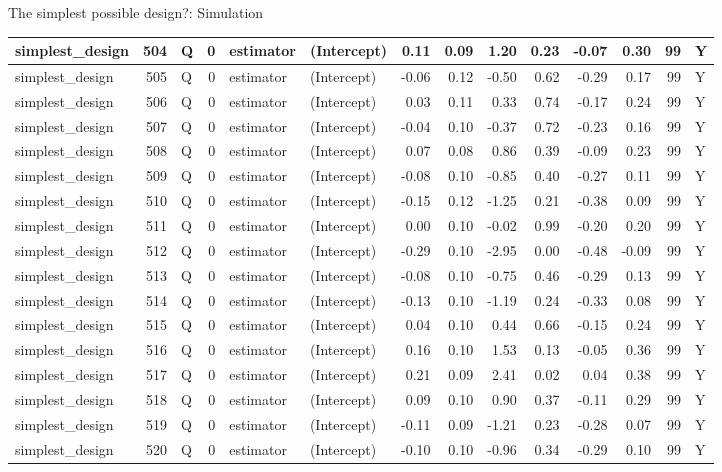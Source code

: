\documentclass[
  11pt,
  ignorenonframetext,
]{beamer}
\begin{document}
\begin{frame}[fragile]{The simplest possible design?: Simulation}
\begin{tabular}{l|r|l|r|l|l|r|r|r|r|r|r|r|l}
\hline
simplest\_design & 504 & Q & 0 & estimator & (Intercept) & 0.11 & 0.09 & 1.20 & 0.23 & -0.07 & 0.30 & 99 & Y\\
\hline
simplest\_design & 505 & Q & 0 & estimator & (Intercept) & -0.06 & 0.12 & -0.50 & 0.62 & -0.29 & 0.17 & 99 & Y\\
\hline
simplest\_design & 506 & Q & 0 & estimator & (Intercept) & 0.03 & 0.11 & 0.33 & 0.74 & -0.17 & 0.24 & 99 & Y\\
\hline
simplest\_design & 507 & Q & 0 & estimator & (Intercept) & -0.04 & 0.10 & -0.37 & 0.72 & -0.23 & 0.16 & 99 & Y\\
\hline
simplest\_design & 508 & Q & 0 & estimator & (Intercept) & 0.07 & 0.08 & 0.86 & 0.39 & -0.09 & 0.23 & 99 & Y\\
\hline
simplest\_design & 509 & Q & 0 & estimator & (Intercept) & -0.08 & 0.10 & -0.85 & 0.40 & -0.27 & 0.11 & 99 & Y\\
\hline
simplest\_design & 510 & Q & 0 & estimator & (Intercept) & -0.15 & 0.12 & -1.25 & 0.21 & -0.38 & 0.09 & 99 & Y\\
\hline
simplest\_design & 511 & Q & 0 & estimator & (Intercept) & 0.00 & 0.10 & -0.02 & 0.99 & -0.20 & 0.20 & 99 & Y\\
\hline
simplest\_design & 512 & Q & 0 & estimator & (Intercept) & -0.29 & 0.10 & -2.95 & 0.00 & -0.48 & -0.09 & 99 & Y\\
\hline
simplest\_design & 513 & Q & 0 & estimator & (Intercept) & -0.08 & 0.10 & -0.75 & 0.46 & -0.29 & 0.13 & 99 & Y\\
\hline
simplest\_design & 514 & Q & 0 & estimator & (Intercept) & -0.13 & 0.10 & -1.19 & 0.24 & -0.33 & 0.08 & 99 & Y\\
\hline
simplest\_design & 515 & Q & 0 & estimator & (Intercept) & 0.04 & 0.10 & 0.44 & 0.66 & -0.15 & 0.24 & 99 & Y\\
\hline
simplest\_design & 516 & Q & 0 & estimator & (Intercept) & 0.16 & 0.10 & 1.53 & 0.13 & -0.05 & 0.36 & 99 & Y\\
\hline
simplest\_design & 517 & Q & 0 & estimator & (Intercept) & 0.21 & 0.09 & 2.41 & 0.02 & 0.04 & 0.38 & 99 & Y\\
\hline
simplest\_design & 518 & Q & 0 & estimator & (Intercept) & 0.09 & 0.10 & 0.90 & 0.37 & -0.11 & 0.29 & 99 & Y\\
\hline
simplest\_design & 519 & Q & 0 & estimator & (Intercept) & -0.11 & 0.09 & -1.21 & 0.23 & -0.28 & 0.07 & 99 & Y\\
\hline
simplest\_design & 520 & Q & 0 & estimator & (Intercept) & -0.10 & 0.10 & -0.96 & 0.34 & -0.29 & 0.10 & 99 & Y\\

\end{tabular}
\end{frame}
\end{document}

